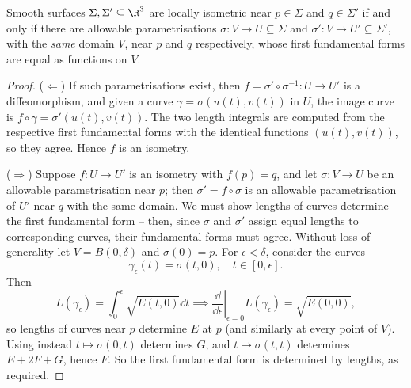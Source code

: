 \begin{lemma}\label{lem:fffisometry}
    Smooth surfaces $\Sigma, \Sigma' \subseteq \R^3$ are locally isometric near $p \in \Sigma$ and $q \in \Sigma'$ if and only if there are allowable parametrisations $\sigma: V \rightarrow U \subseteq \Sigma$ and $\sigma': V \rightarrow U' \subseteq \Sigma'$, with the \emph{same} domain $V$, near $p$ and $q$ respectively, whose first fundamental forms are equal as functions on $V$.
\end{lemma}
\begin{proof}
    ($\Leftarrow$) If such parametrisations exist, then $f = \sigma' \circ \sigma^{-1}: U \rightarrow U'$ is a diffeomorphism, and given a curve $\gamma = \sigma(u(t), v(t))$ in $U$, the image curve is $f \circ \gamma = \sigma'(u(t), v(t))$. The two length integrals are computed from the respective first fundamental forms with the identical functions $(u(t), v(t))$, so they agree. Hence $f$ is an isometry.

    ($\Rightarrow$) Suppose $f: U \rightarrow U'$ is an isometry with $f(p) = q$, and let $\sigma: V \rightarrow U$ be an allowable parametrisation near $p$; then $\sigma' = f \circ \sigma$ is an allowable parametrisation of $U'$ near $q$ with the same domain. We must show lengths of curves determine the first fundamental form -- then, since $\sigma$ and $\sigma'$ assign equal lengths to corresponding curves, their fundamental forms must agree. Without loss of generality let $V = B(0, \delta)$ and $\sigma(0) = p$. For $\epsilon < \delta$, consider the curves
    $$
    \gamma_\epsilon(t) = \sigma(t, 0), \quad t \in [0, \epsilon].
    $$
    Then
    $$
    L(\gamma_\epsilon) = \int_0^\epsilon \sqrt{E(t, 0)} \dd t \implies \left.\frac{\dd}{\dd \epsilon}\right|_{\epsilon = 0} L(\gamma_\epsilon) = \sqrt{E(0,0)},
    $$
    so lengths of curves near $p$ determine $E$ at $p$ (and similarly at every point of $V$). Using instead $t \mapsto \sigma(0, t)$ determines $G$, and $t \mapsto \sigma(t, t)$ determines $E + 2F + G$, hence $F$. So the first fundamental form is determined by lengths, as required.
\end{proof}

